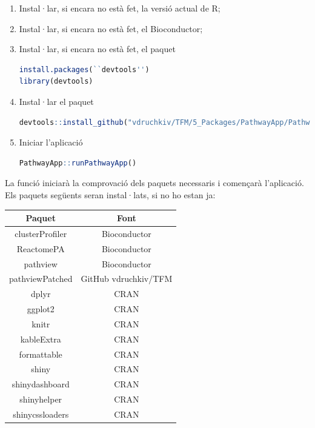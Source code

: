 \begin{enumerate}
\item Instal·lar, si encara no està fet, la versió actual de R;

\item Instal·lar, si encara no està fet, el \gls{Bioconductor};

\item Instal·lar, si encara no està fet, el paquet 

\begin{lstlisting}[language=R]
install.packages(``devtools'')
library(devtools)
\end{lstlisting}

\item Instal·lar el paquet 

\begin{lstlisting}[language=R]
devtools::install_github("vdruchkiv/TFM/5_Packages/PathwayApp/PathwayApp")
\end{lstlisting}

\item Iniciar l'aplicació 
\begin{lstlisting}[language=R]
PathwayApp::runPathwayApp()
\end{lstlisting}
\end{enumerate}

La funció  iniciarà la comprovació dels paquets necessaris i començarà l'aplicació. Els paquets següents seran instal·lats, si no ho estan ja:

\begin{center}
\begin{tabular}{||c | c ||} 
\hline\hline 
\textbf{Paquet} & \textbf{Font} \\ [0.5ex] 
\hline\hline
clusterProfiler & \gls{Bioconductor} \\
\hline
ReactomePA & \gls{Bioconductor} \\
\hline
pathview & \gls{Bioconductor} \\ 
\hline
pathviewPatched & GitHub vdruchkiv/TFM\\
\hline
dplyr & CRAN \\
\hline 
ggplot2 & CRAN \\
\hline
knitr & CRAN \\
\hline
kableExtra & CRAN \\
\hline
formattable & CRAN \\
\hline
shiny & CRAN \\
\hline 
shinydashboard & CRAN \\ 
\hline
shinyhelper & CRAN \\
\hline 
shinycssloaders & CRAN\\
\hline\hline
\end{tabular}
\end{center}

